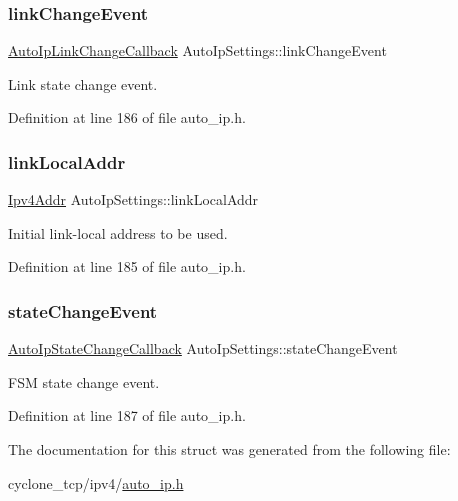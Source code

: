 \subsubsection{\texorpdfstring{link\+Change\+Event}{linkChangeEvent}}
{\footnotesize\ttfamily \hyperlink{auto__ip_8h_a88d83d5933a137c867d45270dc4f89e7}{Auto\+Ip\+Link\+Change\+Callback} Auto\+Ip\+Settings\+::link\+Change\+Event}



Link state change event. 



Definition at line 186 of file auto\+\_\+ip.\+h.

\mbox{\label{structAutoIpSettings_a3352d92469da4349341f2525dc259d01}} 
\subsubsection{\texorpdfstring{link\+Local\+Addr}{linkLocalAddr}}
{\footnotesize\ttfamily \hyperlink{ipv4_8h_a411debb3d770caa0c06d3f73367da37f}{Ipv4\+Addr} Auto\+Ip\+Settings\+::link\+Local\+Addr}



Initial link-\/local address to be used. 



Definition at line 185 of file auto\+\_\+ip.\+h.

\mbox{\label{structAutoIpSettings_afa5654a05fd29d59e59d2a346b0c0257}} 
\subsubsection{\texorpdfstring{state\+Change\+Event}{stateChangeEvent}}
{\footnotesize\ttfamily \hyperlink{auto__ip_8h_a2b8a7f5af501a3e7b34fdd9b496f00a2}{Auto\+Ip\+State\+Change\+Callback} Auto\+Ip\+Settings\+::state\+Change\+Event}



F\+SM state change event. 



Definition at line 187 of file auto\+\_\+ip.\+h.



The documentation for this struct was generated from the following file\+:\begin{DoxyCompactItemize}
\item 
cyclone\+\_\+tcp/ipv4/\hyperlink{auto__ip_8h}{auto\+\_\+ip.\+h}\end{DoxyCompactItemize}

